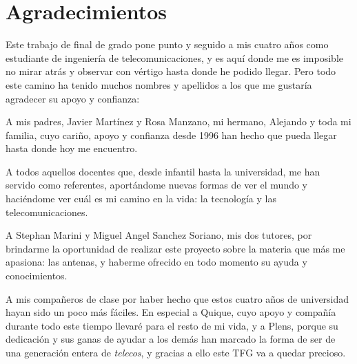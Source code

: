 

\cleardoublepage %
\chapter*{Agradecimientos}

\thispagestyle{empty}
\vspace{1cm}

\par Este trabajo de final de grado pone punto y seguido a mis cuatro años como estudiante de ingeniería de telecomunicaciones, y es aquí donde me es imposible no mirar atrás y observar con vértigo hasta donde he podido llegar.
Pero todo este camino ha tenido muchos nombres y apellidos a los que me gustaría agradecer su apoyo y confianza:

\par A mis padres, Javier Martínez y Rosa Manzano, mi hermano, Alejando y toda mi familia, cuyo cariño, apoyo y confianza desde 1996 han hecho que pueda llegar hasta donde hoy me encuentro.



\par A todos aquellos docentes que, desde infantil hasta la universidad, me han servido como referentes, aportándome nuevas formas de ver el mundo y haciéndome ver cuál es mi camino en la vida: la tecnología y las telecomunicaciones.




\par A Stephan Marini y Miguel Angel Sanchez Soriano, mis dos tutores, por brindarme la oportunidad de realizar este proyecto sobre la materia que más me apasiona: las antenas, y haberme ofrecido en todo momento su ayuda y conocimientos.




\par A mis compañeros de clase por haber hecho que estos cuatro años de universidad hayan sido un poco más fáciles. En especial a Quique, cuyo apoyo y compañía durante todo este tiempo llevaré para el resto de mi vida, y a Plens, porque su dedicación y sus ganas de ayudar a los demás han marcado la forma de ser de una generación entera de \textit{telecos}, y gracias a ello este TFG va a quedar precioso. 




